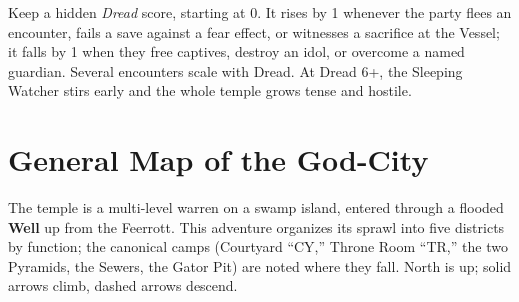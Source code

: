 \documentclass[10pt,twoside]{article}
\begin{document}
\begin{dmnote}
Keep a hidden \emph{Dread} score, starting at 0. It rises by 1 whenever the party
flees an encounter, fails a save against a fear effect, or witnesses a sacrifice at
the Vessel; it falls by 1 when they free captives, destroy an idol, or overcome a
named guardian. Several encounters scale with Dread. At Dread 6+, the Sleeping
Watcher stirs early and the whole temple grows tense and hostile.
\end{dmnote}
\clearpage

\section*{General Map of the God-City}

The temple is a multi-level warren on a swamp island, entered through a flooded
\textbf{Well} up from the Feerrott. This adventure organizes its sprawl into five
districts by function; the canonical camps (Courtyard ``CY,'' Throne Room ``TR,''
the two Pyramids, the Sewers, the Gator Pit) are noted where they fall. North is up;
solid arrows climb, dashed arrows descend.
\end{document}
